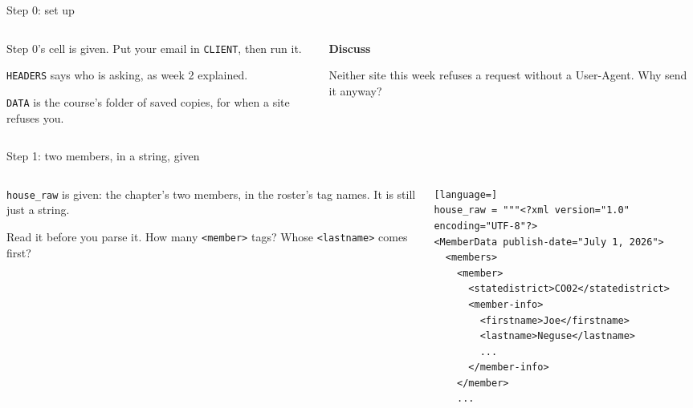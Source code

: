 \documentclass[9pt,aspectratio=169]{beamer}
\begin{document}
\begin{frame}{Step 0: set up}
    \begin{columns}[T]
        \begin{column}{0.6\textwidth}
            Step 0's cell is given. Put your email in \texttt{CLIENT}, then run it.

            \medskip
            \texttt{HEADERS} says who is asking, as week 2 explained.

            \medskip
            \texttt{DATA} is the course's folder of saved copies, for when a site refuses you.
        \end{column}
        \begin{column}{0.35\textwidth}
            \textbf{Discuss}\\[2pt]
            {\footnotesize Neither site this week refuses a request without a User-Agent. Why send it anyway?\par}
        \end{column}
    \end{columns}
\end{frame}

\begin{frame}[fragile]{Step 1: two members, in a string, given}
    \begin{columns}[T]
        \begin{column}{0.37\textwidth}
            \texttt{house\_raw} is given: the chapter's two members, in the roster's tag names. It is still just a string.

            \medskip
            Read it before you parse it. How many \texttt{<member>} tags? Whose \texttt{<lastname>} comes first?
        \end{column}
        \begin{column}{0.6\textwidth}
\begin{lstlisting}[language=]
house_raw = """<?xml version="1.0" encoding="UTF-8"?>
<MemberData publish-date="July 1, 2026">
  <members>
    <member>
      <statedistrict>CO02</statedistrict>
      <member-info>
        <firstname>Joe</firstname>
        <lastname>Neguse</lastname>
        ...
      </member-info>
    </member>
    ...
\end{lstlisting}
        \end{column}
    \end{columns}
\end{frame}
\end{document}
